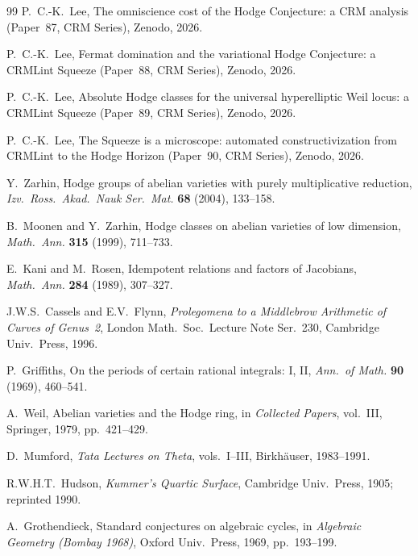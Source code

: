 \documentclass[11pt]{article}
\theoremstyle{plain}
\theoremstyle{definition}
\theoremstyle{remark}
\begin{document}
\begin{thebibliography}{99}
P.~C.-K.\ Lee,
The omniscience cost of the Hodge Conjecture: a CRM analysis
(Paper~87, CRM Series),
Zenodo, 2026.

P.~C.-K.\ Lee,
Fermat domination and the variational Hodge Conjecture: a CRMLint Squeeze
(Paper~88, CRM Series),
Zenodo, 2026.

P.~C.-K.\ Lee,
Absolute Hodge classes for the universal hyperelliptic Weil locus:
a CRMLint Squeeze (Paper~89, CRM Series),
Zenodo, 2026.

P.~C.-K.\ Lee,
The Squeeze is a microscope: automated constructivization from
CRMLint to the Hodge Horizon (Paper~90, CRM Series),
Zenodo, 2026.

Y.~Zarhin,
Hodge groups of abelian varieties with purely multiplicative
reduction,
\emph{Izv.\ Ross.\ Akad.\ Nauk Ser.\ Mat.} \textbf{68} (2004),
133--158.

B.~Moonen and Y.~Zarhin,
Hodge classes on abelian varieties of low dimension,
\emph{Math.\ Ann.} \textbf{315} (1999), 711--733.

E.~Kani and M.~Rosen,
Idempotent relations and factors of Jacobians,
\emph{Math.\ Ann.} \textbf{284} (1989), 307--327.

J.W.S.~Cassels and E.V.~Flynn,
\emph{Prolegomena to a Middlebrow Arithmetic of Curves of Genus~2},
London Math.\ Soc.\ Lecture Note Ser.~230, Cambridge Univ.\ Press, 1996.

P.~Griffiths,
On the periods of certain rational integrals: I, II,
\emph{Ann.\ of Math.} \textbf{90} (1969), 460--541.

A.~Weil,
Abelian varieties and the Hodge ring,
in \emph{Collected Papers}, vol.~III, Springer, 1979, pp.~421--429.

D.~Mumford,
\emph{Tata Lectures on Theta}, vols.~I--III,
Birkh\"auser, 1983--1991.

R.W.H.T.~Hudson,
\emph{Kummer's Quartic Surface},
Cambridge Univ.\ Press, 1905; reprinted 1990.

A.~Grothendieck,
Standard conjectures on algebraic cycles,
in \emph{Algebraic Geometry (Bombay 1968)}, Oxford Univ.\ Press, 1969,
pp.~193--199.

\end{thebibliography}
\end{document}
